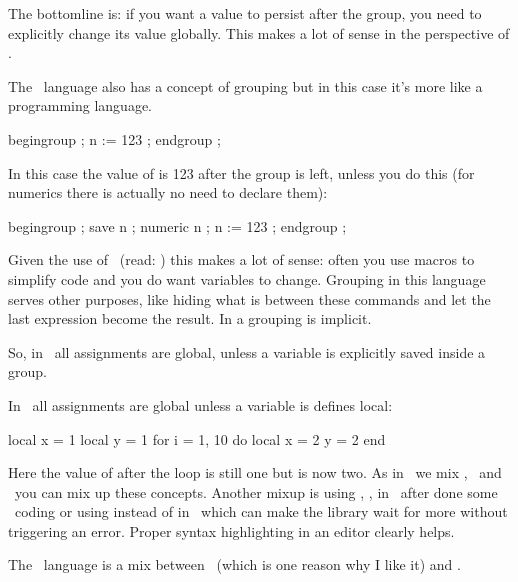 \starttyping[option=TEX]
\bgroup
\endgroup
\stoptyping

The bottomline is: if you want a value to persist after the group, you need to
explicitly change its value globally. This makes a lot of sense in the perspective
of \TEX.

\stopsectionlevel

\startsectionlevel[title=\METAPOST]

The \METAPOST\ language also has a concept of grouping but in this case it's more like a
programming language.

\starttyping[option=MP]
begingroup ;
    n := 123 ;
endgroup ;
\stoptyping

In this case the value of  is 123 after the group is left, unless you do
this (for numerics there is actually no need to declare them):

\starttyping[option=MP]
begingroup ;
    save n ; numeric n ; n := 123 ;
endgroup ;
\stoptyping

Given the use of \METAPOST\ (read: \METAFONT) this makes a lot of sense: often
you use macros to simplify code and you do want variables to change. Grouping in
this language serves other purposes, like hiding what is between these commands
and let the last expression become the result. In a  grouping is
implicit.

So, in \METAPOST\ all assignments are global, unless a variable is explicitly
saved inside a group.

\stopsectionlevel

\startsectionlevel[title=\LUA]

In \LUA\ all assignments are global unless a variable is defines local:

\starttyping[option=LUA]
local x = 1
local y = 1
for i = 1, 10 do
    local x = 2
    y = 2
end
\stoptyping

Here the value of  after the loop is still one but  is now two.
As in \LUATEX\ we mix \TEX, \METAPOST\ and \LUA\ you can mix up these concepts.
Another mixup is using \type {:=}, ,  in \LUA\ after done
some \METAPOST\ coding or using  instead of  in
\METAPOST\ which can make the library wait for more without triggering an error.
Proper syntax highlighting in an editor clearly helps.

\stopsectionlevel

\startsectionlevel[title=\CCODE]

The \LUA\ language is a mix between \PASCAL\ (which is one reason why I like it)
and \CCODE.

